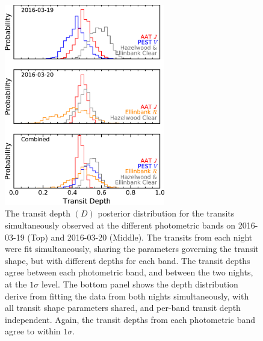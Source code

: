 \documentclass[iop,useAMES,usenatbig]{emulateapj}
\begin{document}
\begin{figure}
    \centering
    \includegraphics[width=7cm]{plots/depth_hist.eps}
    \caption{The transit depth $(D)$ posterior distribution for the transits simultaneously observed at the different photometric bands on 2016-03-19 (Top) and 2016-03-20 (Middle). The transits from each night were fit simultaneously, sharing the parameters governing the transit shape, but with different depths for each band. The transit depths agree between each photometric band, and between the two nights, at the $1\sigma$ level. The bottom panel shows the depth distribution derive from fitting the data from both nights simultaneously, with all transit shape parameters shared, and per-band transit depth independent. Again, the transit depths from each photometric band agree to within $1\sigma$.}
    \label{fig:depth_hist}
\end{figure}
\end{document}
